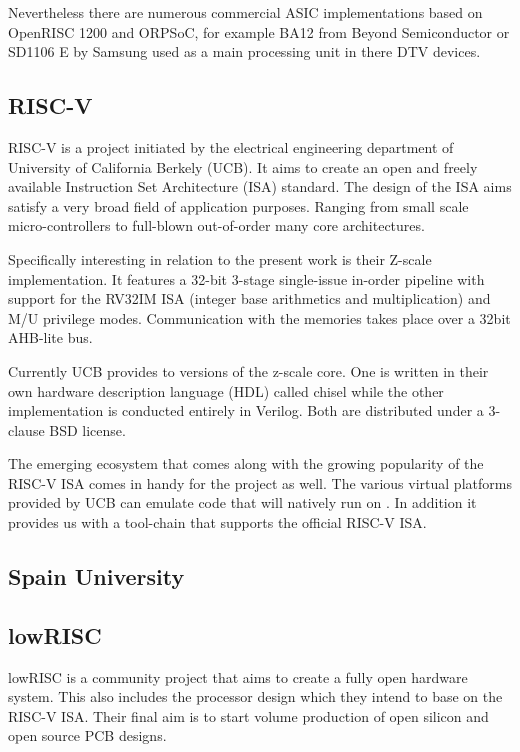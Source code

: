 Nevertheless there are numerous commercial ASIC implementations based on OpenRISC 1200 and ORPSoC, for example BA12 from Beyond Semiconductor or SD1106 E by Samsung used as a main processing unit in there \gls{DTV} devices.

\subsection{RISC-V}

RISC-V is a project initiated by the electrical engineering department of University of California Berkely (UCB). It aims to create an open and freely available Instruction Set Architecture (ISA) standard. The design of the ISA aims satisfy a very broad field of application purposes. Ranging from small scale micro-controllers to full-blown out-of-order many core architectures.

Specifically interesting in relation to the present work is their Z-scale implementation. It features a 32-bit 3-stage single-issue in-order pipeline with support for the RV32IM ISA (integer base arithmetics and multiplication) and M/U privilege modes. Communication with the memories takes place over a 32bit AHB-lite bus.

Currently UCB provides to versions of the z-scale core. One is written in their own hardware description language (HDL) called chisel while the other implementation is conducted entirely in Verilog. Both are distributed under a 3-clause BSD license.

The emerging ecosystem that comes along with the growing popularity of the RISC-V ISA comes in handy for the \pulpino project as well. The various virtual platforms provided by UCB can emulate code that will natively run on \pulpino. In addition it provides us with a tool-chain that supports the official RISC-V ISA.

\subsection{Spain University}

\subsection{lowRISC}

lowRISC is a community project that aims to create a fully open hardware system. This also includes the processor design which they intend to base on the RISC-V ISA. Their final aim is to start volume production of open silicon and open source PCB designs.


